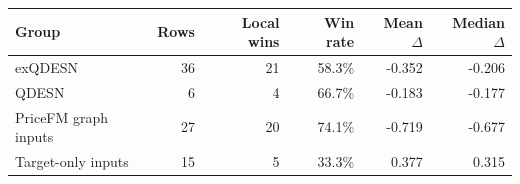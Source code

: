 \begin{tabular}{lrrrrr}
\toprule
Group & Rows & Local wins & Win rate & Mean $\Delta$ & Median $\Delta$ \\
\midrule
exQDESN & 36 & 21 & 58.3\% & -0.352 & -0.206 \\
QDESN & 6 & 4 & 66.7\% & -0.183 & -0.177 \\
PriceFM graph inputs & 27 & 20 & 74.1\% & -0.719 & -0.677 \\
Target-only inputs & 15 & 5 & 33.3\% & 0.377 & 0.315 \\
\bottomrule
\end{tabular}
